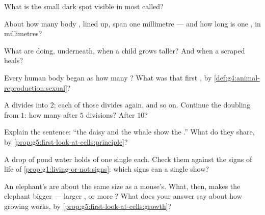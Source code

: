 \begin{exercise}[$\star$]\label{exo:g5:first-look-at-cells:4}
What is the small dark spot visible in most  called?
\end{exercise}

\begin{exercise}[$\star$]\label{exo:g5:first-look-at-cells:5}
About how many body , lined up, span one millimetre ---
and how long is one , in millimetres?
\end{exercise}

\begin{exercise}[$\star$]\label{exo:g5:first-look-at-cells:6}
What are  doing, underneath, when a child grows taller?
And when a scraped  heals?
\end{exercise}

\begin{exercise}[$\star$]\label{exo:g5:first-look-at-cells:7}
Every human body began as how many ? What was that
first , by \cref{def:g4:animal-reproduction:sexual}?
\end{exercise}

\begin{exercise}[$\star$]\label{exo:g5:first-look-at-cells:8}
A  divides into $2$; each of those divides again, and so
on. Continue the doubling from $1$: how many  after
$5$ divisions? After $10$?
\end{exercise}

\begin{exercise}[$\star\star$]\label{exo:g5:first-look-at-cells:9}
Explain the sentence: ``the daisy and the whale show the
.'' What do they share, by
\cref{prop:g5:first-look-at-cells:principle}?
\end{exercise}

\begin{exercise}[$\star\star$]\label{exo:g5:first-look-at-cells:10}
A drop of pond water holds  of one single 
each. Check them against the signs of life of
\cref{prop:g1:living-or-not:signs}: which signs can a single
 show?
\end{exercise}

\begin{exercise}[$\star\star\star$]\label{exo:g5:first-look-at-cells:11}
An elephant's  are about the same size as a mouse's.
What, then, makes the elephant bigger --- larger , or
more ? What does your answer say about how growing
works, by \cref{prop:g5:first-look-at-cells:growth}?
\end{exercise}
